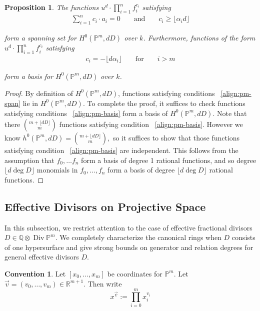 \documentclass{amsart}
\theoremstyle{plain}
\newtheorem{prop}[thm]{Proposition}
\theoremstyle{definition}
\newtheorem{convention}[thm]{Convention}
\theoremstyle{remark}
\numberwithin{equation}{section}
\newcommand\ssec{\subsection}
\newcommand\br{{\mathbb R}}
\newcommand\bq{{\mathbb Q}}
\newcommand\bp{{\mathbb P}}
\DeclareMathOperator\di{Div}
\newcommand\bida{a}
\begin{document}
\begin{prop}
\label{prop:pm-span-and-basis}
The functions $u^d \cdot \prod_{i=1}^n f_i^{c_i}$ satisfying
\begin{align}
\label{align:pm-span}
\sum_{i=1}^{n} c_i \cdot \bida_i = 0 && \text{ and } &&c_i \geq \lfloor \alpha_i d\rfloor	
\end{align}

\noindent
form a spanning set for $H^0(\bp^m, dD)$ over $k$. Furthermore, functions 
of the form $u^d \cdot \prod_{i=1}^n f_i^{c_i}$ satisfying
\begin{align}
\label{align:pm-basis}
c_i = -\lfloor d\alpha_i \rfloor && \text{ for } && i > m
\end{align}

\noindent
form a basis for $H^0(\bp^m, dD)$ over $k$.
\end{prop}

\begin{proof}
By definition of $H^0(\bp^m,dD)$, functions satisfying conditions 
~\eqref{align:pm-span} lie in $H^0(\bp^m,dD)$. To complete the proof, it
suffices to check functions satisfying conditions ~\eqref{align:pm-basis} form
a basis of $H^0(\bp^m,dD)$. Note that there $\binom{m+ \lfloor dD \rfloor }{m}$
functions satisfying condition ~\eqref{align:pm-basis}. However we know
$h^0(\bp^m,dD) = \binom{m+ \lfloor dD \rfloor }{m},$ so it suffices to show
that those functions satisfying condition ~\eqref{align:pm-basis} are
independent. This follows from the assumption that $f_0,\ldots f_n$ form a
basis of degree 1 rational functions, and so degree $\lfloor d \deg D \rfloor $
monomials in $f_0,\ldots, f_n$ form a basis of degree $\lfloor d \deg D \rfloor
$ rational functions.
\end{proof}

\ssec{Effective Divisors on Projective Space}
\label{ssec:proj-one-point}

In this subsection, we restrict attention to the case of effective
fractional divisors $D \in \bq \otimes \di \bp^m$. We completely
characterize the canonical rings when $D$ consists of one
hypersurface and give strong bounds on generator and relation
degrees for general effective divisors $D$.

\begin{convention}
Let $[x_0, \ldots, x_m]$ be coordinates for $\bp^m$. Let
$\vec{v} = (v_0, \ldots, v_m) \in \br^{m + 1}$. Then write
\[
	x^{\vec{v}} := \prod_{i = 0}^{m} x_i^{v_i}
\]
\end{convention}
\end{document}
